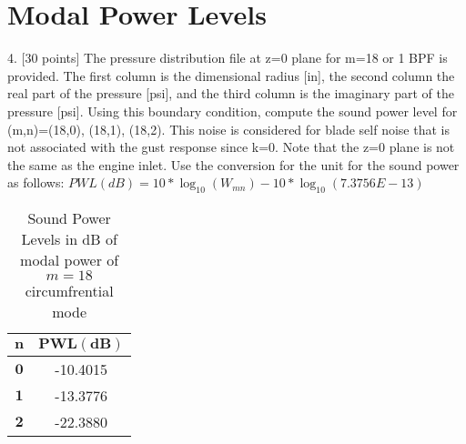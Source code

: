 \documentclass[]{aiaa-tc}%
\begin{document}
\section{Modal Power Levels}

4. [30 points] The pressure distribution file at z=0 plane for m=18 or 1 BPF is provided. The first column is the dimensional radius [in], the second column the real part of the pressure [psi], and the third column is the imaginary part of the pressure [psi]. Using this boundary condition, compute the sound power level for (m,n)=(18,0), (18,1), (18,2). This noise is considered for blade self noise that is not associated with the gust response since k=0. Note that the z=0 plane is not the same as the engine inlet. Use the conversion for the unit for the sound power as follows: $PWL(dB) = 10*\log_{10}(W_{mn}) - 10*\log_{10}(7.3756E-13)$

\begin{table}[htb]
\begin{centering}
\begin{tabular}{| c | c |}
\hline
$\mathbf{n}$ &  $\mathbf{PWL (dB)}$ \\
\hline
$\mathbf{0}$ &       -10.4015 \\
$\mathbf{1}$ &       -13.3776 \\
$\mathbf{2}$ &       -22.3880 \\
\hline
\end{tabular}
\caption{Sound Power Levels in dB of modal power of $m=18$ circumfrential mode}
\end{centering}
\end{table}
\end{document}
